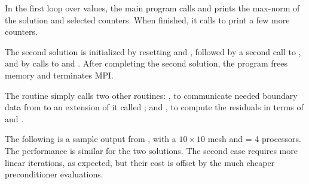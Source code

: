 In the first loop over  values, the main program calls 
and prints the max-norm of the solution and selected counters.  When finished,
it calls  to print a few more counters.

The second solution is initialized by resetting  and ,
followed by a second call to , and by calls to  
and .  After completing the second solution, the
program frees memory and terminates MPI.

The  routine simply calls two other routines: ,
to communicate needed boundary data from  to an extension of it called
; and , to compute the residuals in terms of
 and .

The following is a sample output from , with a $10 \times 10$
mesh and  = 4 processors.  The performance is similar for the two
solutions.  The second case requires more linear iterations, as expected, 
but their cost is offset by the much cheaper preconditioner evaluations.



